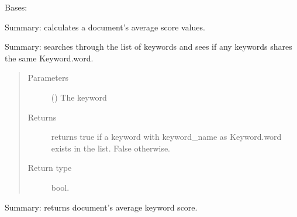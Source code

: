 \documentclass[letterpaper,10pt,english]{sphinxmanual}
\begin{document}
\begin{fulllineitems}
\label{\detokenize{KeywordList:KeywordList.KeywordList}}
Bases: 

\begin{fulllineitems}
\label{\detokenize{KeywordList:KeywordList.KeywordList.calculateavgscores}}
Summary: calculates a document’s average score values.

\end{fulllineitems}


\begin{fulllineitems}
\label{\detokenize{KeywordList:KeywordList.KeywordList.existsinlist}}
Summary: searches through the list of keywords and sees if any keywords shares the same Keyword.word.
\begin{quote}\begin{description}
\item[{Parameters}] \leavevmode
{} () \textendash{} The keyword

\item[{Returns}] \leavevmode
returns true if a keyword with keyword\_name as Keyword.word exists in the list. False otherwise.

\item[{Return type}] \leavevmode
bool.

\end{description}\end{quote}

\end{fulllineitems}


\begin{fulllineitems}
\label{\detokenize{KeywordList:KeywordList.KeywordList.getavgkeywordscore}}
Summary: returns document’s average keyword score.

\end{fulllineitems}



\end{fulllineitems}
\end{document}
